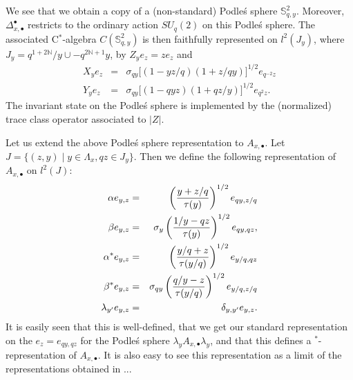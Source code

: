 We see that we obtain a copy of a (non-standard) Podle\'{s} sphere $\mathbb{S}_{q,y}^2$. Moreover, $\Delta_{x,\bullet}^{\bullet}$ restricts to the ordinary action $SU_q(2)$ on this Podle\'{s} sphere. The associated C$^*$-algebra $C(\mathbb{S}_{q,y}^2)$ is then faithfully represented on $l^2(J_{y})$, where $J_y = q^{1+2\mathbb{N}}/y\cup -q^{2\mathbb{N}+1}y$, by $Z_ye_z = z e_{z}$ and \begin{eqnarray*} X_ye_{z} &=& \sigma_{qy} \lbrack (1-yz/q)(1+z/qy)\rbrack^{1/2}e_{q^{-2}z}\\ Y_ye_{z} &=& \sigma_{qy} \lbrack (1-qyz)(1+qz/y)\rbrack^{1/2}e_{q^2z}.\end{eqnarray*} The invariant state on the Podle\'{s} sphere is implemented by the (normalized) trace class operator associated to $|Z|$. 

Let us extend the above Podle\'{s} sphere representation to $A_{x,\bullet}$.  Let $J =\{(z,y)\mid y \in \Lambda_x, qz \in J_{y}\}$. Then we define the following representation of $A_{x,\bullet}$ on $l^2(J)$: \begin{eqnarray*} \alpha e_{y,z} &=&  \left(\frac{y+z/q}{\operatorname{\tau}(y)}\right)^{1/2}e_{qy,z/q}\\ \beta e_{y,z} &=&  \sigma_y \left( \frac{1/y-qz}{\operatorname{\tau}(y)}\right)^{1/2}e_{qy,qz},  \\  \alpha^* e_{y,z} &=&  \left(\frac{y/q+z}{\operatorname{\tau}(y/q)}\right)^{1/2}e_{y/q,qz} \\ \beta^* e_{y,z} &=& \sigma_{qy}\left( \frac{q/y-z}{\operatorname{\tau}(y/q)}\right)^{1/2}e_{y/q,z/q}
 \\ \lambda_{y'} e_{y,z} &=& \delta_{y,y'}e_{y,z}. \end{eqnarray*} It is easily seen that this is well-defined, that we get our standard representation on the $e_{z} = e_{qy,qz}$ for the Podle\'{s} sphere $\lambda_y A_{x,\bullet}\lambda_y$, and that this defines a $^*$-representation of $A_{x,\bullet}$. It is also easy to see this representation as a limit of the representations obtained in ...


